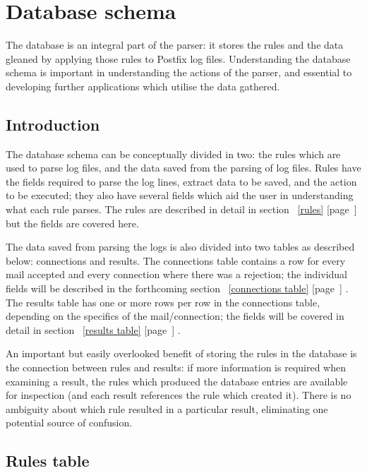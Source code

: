 \documentclass[a4paper,12pt,draft]{article}
\newcommand{\refwithpage}[1]{%
    \empty{}\ref{#1} [page~\pageref{#1}]%
}
\begin{document}
\section{Database schema}
\label{database schema}

The database is an integral part of the parser: it stores the rules and the
data gleaned by applying those rules to Postfix log files.  Understanding
the database schema is important in understanding the actions of the
parser, and essential to developing further applications which utilise the
data gathered.

\subsection{Introduction}

The database schema can be conceptually divided in two: the rules which are
used to parse log files, and the data saved from the parsing of log files.
Rules have the fields required to parse the log lines, extract data to be
saved, and the action to be executed; they also have several fields which
aid the user in understanding what each rule parses.  The rules are
described in detail in section~\refwithpage{rules} but the fields are
covered here.

The data saved from parsing the logs is also divided into two tables as
described below: connections and results.  The connections table contains a
row for every mail accepted and every connection where there was a
rejection; the individual fields will be described in the forthcoming
section~\refwithpage{connections table}.  The results table has one or more
rows per row in the connections table, depending on the specifics of the
mail/connection; the fields will be covered in detail in
section~\refwithpage{results table}.

An important but easily overlooked benefit of storing the rules in the
database is the connection between rules and results: if more information
is required when examining a result, the rules which produced the database
entries are available for inspection (and each result references the rule
which created it).  There is no ambiguity about which rule resulted in a
particular result, eliminating one potential source of confusion.

\subsection{Rules table}

\label{rule attributes}
\end{document}
